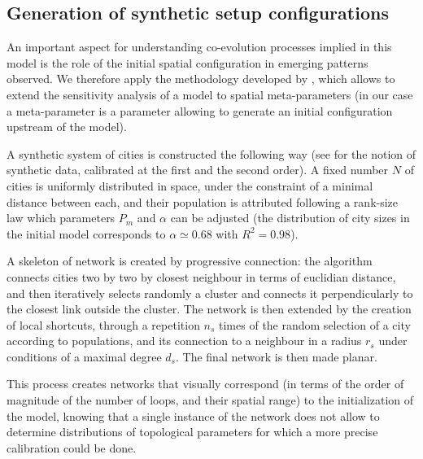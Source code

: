 \subsection{Generation of synthetic setup configurations}


An important aspect for understanding co-evolution processes implied in this model is the role of the initial spatial configuration in emerging patterns observed. We therefore apply the methodology developed by \cite{cottineau2017initial}, which allows to extend the sensitivity analysis of a model to spatial meta-parameters (in our case a meta-parameter is a parameter allowing to generate an initial configuration upstream of the model).



A synthetic system of cities is constructed the following way (see \cite{raimbault2016generation} for the notion of synthetic data, calibrated at the first and the second order). A fixed number $N$ of cities is uniformly distributed in space, under the constraint of a minimal distance between each, and their population is attributed following a rank-size law which parameters $P_{m}$ and $\alpha$ can be adjusted (the distribution of city sizes in the initial model corresponds to $\alpha\simeq 0.68$ with $R^2=0.98$).


A skeleton of network is created by progressive connection: the algorithm connects cities two by two by closest neighbour in terms of euclidian distance, and then iteratively selects randomly a cluster and connects it perpendicularly to the closest link outside the cluster. The network is then extended by the creation of local shortcuts, through a repetition $n_s$ times of the random selection of a city according to populations, and its connection to a neighbour in a radius $r_s$ under conditions of a maximal degree $d_s$. The final network is then made planar.


This process creates networks that visually correspond (in terms of the order of magnitude of the number of loops, and their spatial range) to the initialization of the model, knowing that a single instance of the network does not allow to determine distributions of topological parameters for which a more precise calibration could be done.


